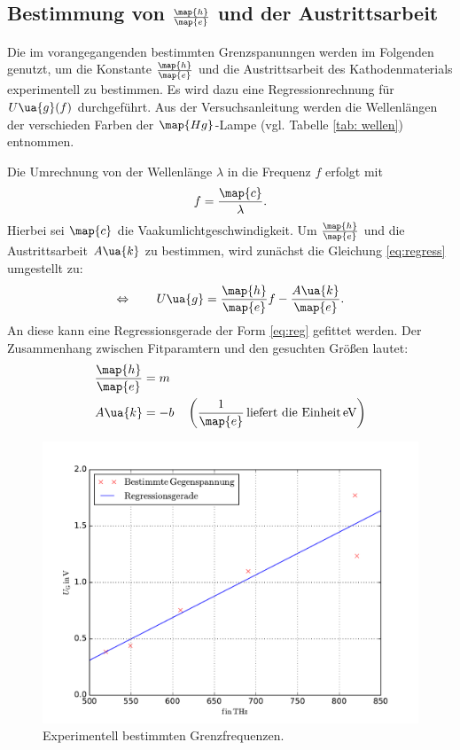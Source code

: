 \subsection{Bestimmung von $\frac{\map{h}}{\map{e}}$ und der Austrittsarbeit}

Die im vorangegangenden bestimmten Grenzspanunngen werden im
Folgenden genutzt, um die Konstante $\frac{\map{h}}{\map{e}}$ und die Austrittsarbeit des Kathodenmaterials
experimentell zu bestimmen.
Es wird dazu eine Regressionrechnung für $U\ua{g}(f)$ durchgeführt.
Aus der Versuchsanleitung\cite{anleitung500} werden die Wellenlängen der verschieden Farben der $\map{Hg}$-Lampe (vgl. Tabelle \ref{tab: wellen})
entnommen.

Die Umrechnung von der Wellenlänge $\lambda$ in die Frequenz $f$ erfolgt mit
\begin{equation*}
  \label{eq:umrech}
  f=\frac{\map{c}}{\lambda}.
\end{equation*}
Hierbei sei $\map{c}$ die Vaakumlichtgeschwindigkeit\cite{scipy}.
Um $\frac{\map{h}}{\map{e}}$ und die Austrittsarbeit $A\ua{k}$ zu bestimmen, wird zunächst die
Gleichung \eqref{eq:regress} umgestellt zu:
\begin{equation*}
  \Leftrightarrow \qquad U\ua{g}=\frac{\map{h}}{\map{e}} f - \frac{A\ua{k}}{\map{e}}.
\end{equation*}
An diese kann eine Regressionsgerade der Form \eqref{eq:reg} gefittet werden.
Der Zusammenhang zwischen Fitparamtern und den gesuchten Größen lautet:
\begin{align*}
  \frac{\map{h}}{\map{e}}&=m\\
  A\ua{k}&=-b \quad \left(\frac{1}{\map{e}}\,\text{liefert die Einheit} \, \si{\eV}\right)
\end{align*}
\begin{figure}
    \centering
    \includegraphics[width=1 \textwidth]{../Messdaten/wellenlaenge_gegen.pdf}
    \caption{Experimentell bestimmten Grenzfrequenzen.}
    \label{fig:grenz}
  \end{figure}
